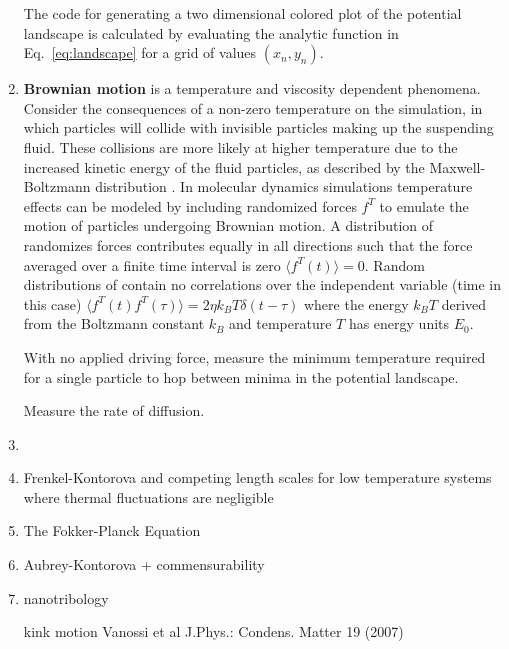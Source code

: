 \documentclass[twocolumn,preprintnumbers,amsmath,amssymb,aps,prx]{revtex4}
\begin{document}
\begin{enumerate}
  The code for generating
a two dimensional colored plot
of the potential landscape
is calculated by evaluating
the analytic function in Eq.~\ref{eq:landscape}
for a grid of values $(x_n,y_n)$.
  

\item {\bf Brownian motion}
  is a temperature and viscosity dependent
  phenomena. \cite{}
  Consider the consequences of a non-zero temperature on the simulation, in which particles will collide with invisible particles making up the suspending fluid.  These collisions are more likely at higher temperature due to the increased kinetic energy of the fluid particles, as described by the Maxwell-Boltzmann distribution \cite{}.  In molecular dynamics simulations temperature effects can be modeled by including randomized forces $f^T$ to emulate the motion of particles undergoing Brownian motion.  A distribution of randomizes forces contributes equally in all directions such that the force averaged over a finite time interval is zero $\langle f^T(t) \rangle = 0$.  Random distributions of contain no correlations over the independent variable (time in this case) $\langle f^T(t) f^T(\tau)\rangle = 2 \eta k_B T \delta(t-\tau)$ where the energy $k_B T$ derived from the Boltzmann constant $k_B$ and temperature $T$ has energy units $E_0$.  \cite{Allen2017}

  With no applied driving force, measure the minimum temperature required for a single particle to hop between minima in the potential landscape.

  Measure the rate of diffusion.

\item
  \label{ex:parameters}
  
\item Frenkel-Kontorova and competing length scales for low temperature systems where thermal fluctuations are negligible

  \item The Fokker-Planck Equation

  \item Aubrey-Kontorova + commensurability

  \item nanotribology

    kink motion
    Vanossi et al J.Phys.: Condens. Matter 19 (2007)

    
\end{enumerate}
\end{document}

